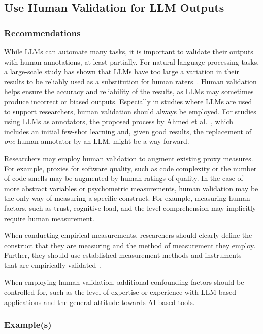 \documentclass[11pt]{article}
\begin{document}
\subsection{Use Human Validation for LLM Outputs}

\subsubsection{Recommendations}

While LLMs can automate many tasks, it is important to validate their outputs with human annotations, at least partially. 
For natural language processing tasks, a large-scale study has shown that LLMs have too large a variation in their results to be reliably used as a substitution for human raters~\cite{DBLP:journals/corr/abs-2406-18403}. 
Human validation helps ensure the accuracy and reliability of the results, as LLMs may sometimes produce incorrect or biased outputs.
Especially in studies where LLMs are used to support researchers, human validation should always be employed.
For studies using LLMs as annotators, the proposed process by Ahmed et al.~\cite{DBLP:journals/corr/abs-2408-05534}, which includes an initial few-shot learning and, given good results, the replacement of \emph{one} human annotator by an LLM, might be a way forward.

Researchers may employ human validation to augment existing proxy measures.
For example, proxies for software quality, such as code complexity or the number of code smells may be augmented by human ratings of quality.
In the case of more abstract variables or psychometric measurements, human validation may be the only way of measuring a specific construct.
For example, measuring human factors, such as trust, cognitive load, and the level comprehension may implicitly require human measurement.

When conducting empirical measurements, researchers should clearly define the construct that they are measuring and the method of measurement they employ.
Further, they should use established measurement methods and instruments~\cite{DBLP:journals/fcomp/HoffmanMKL23} that are empirically validated~\cite{DBLP:conf/chi/PerrigSB23}.

When employing human validation, additional confounding factors should be controlled for, such as the level of expertise or experience with LLM-based applications and the general attitude towards AI-based tools.

\subsubsection{Example(s)}
\end{document}
